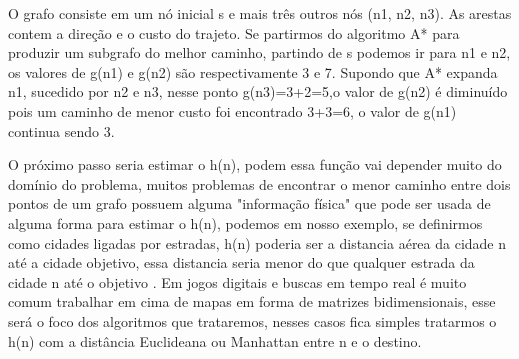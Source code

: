 \begin{minipage}{\linewidth}
\end{minipage}


\begin{description}
    O grafo consiste em um nó inicial s e mais três outros nós (n1, n2, n3). As arestas contem a direção e o custo do trajeto. Se partirmos do algoritmo A* para produzir um subgrafo do melhor caminho, partindo de s podemos ir para n1 e n2, os valores de g(n1) e g(n2) são respectivamente 3 e 7. Supondo que A* expanda n1, sucedido por n2 e n3, nesse ponto g(n3)=3+2=5,o valor de g(n2) é diminuído pois um caminho de menor custo foi encontrado  3+3=6, o valor de g(n1) continua sendo 3.
    
    O próximo passo seria estimar o h(n), podem essa função vai depender muito do domínio do problema, muitos problemas de encontrar o menor caminho entre dois pontos de um grafo possuem alguma "informação física" que pode ser usada de alguma forma para estimar o h(n), podemos em nosso exemplo, se definirmos como cidades ligadas por estradas, h(n) poderia ser a distancia aérea da cidade n até a cidade objetivo, essa distancia seria menor do que qualquer estrada da cidade n até o objetivo \cite{PEHart}. Em jogos digitais e buscas em tempo real é muito comum trabalhar em cima de mapas em forma de matrizes bidimensionais, esse será o foco dos algoritmos que trataremos, nesses casos fica simples tratarmos o h(n) com a distância Euclideana ou Manhattan entre n e o destino. \cite{Yngvi}
\end{description}


